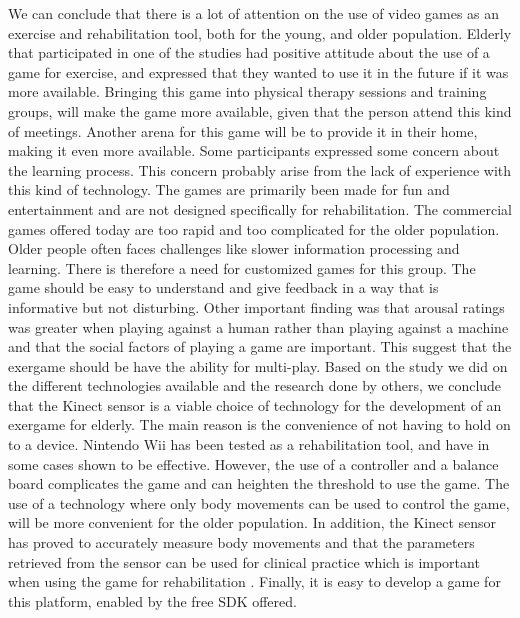 We can conclude that there is a lot of attention on the use of video games as an exercise and rehabilitation tool, both for the young, and older population. Elderly that participated in one of the studies had positive attitude about the use of a game for exercise, and expressed that they wanted to use it in the future if it was more available. Bringing this game into physical therapy sessions and training groups, will make the game more available, given that the  person attend this kind of meetings. Another arena for this game will be to provide it in their home, making it even more available.  Some participants  expressed some concern about the learning process. This concern probably arise from the lack of experience with this kind of technology.  The games are primarily been made for fun and entertainment and are not designed specifically for rehabilitation.  The commercial games offered today are too rapid and too complicated for the older population. Older people often faces challenges like slower information processing and learning. There is therefore a need for customized games for this group. The game should be easy to understand and give feedback in a way that is informative but not disturbing. Other important finding was that arousal ratings was greater when playing against a human rather than playing against a machine and that the social factors of playing a game are important. This suggest that the exergame should be have the ability for multi-play. Based on the study we did on the different technologies available and the research done by others, we conclude that the Kinect sensor is a viable choice of technology for the development of an exergame for elderly. The main reason is the convenience of not having to hold on to a device. Nintendo Wii has been tested as a rehabilitation tool, and have in some cases shown to be effective. However, the use of a controller and a balance board complicates the game and can heighten the threshold to use the game.  The use  of a technology where only body movements can be used to control the game, will be more convenient for the older population. In addition, the Kinect sensor has proved to accurately measure body movements and that the parameters retrieved from the sensor can be used for clinical practice which is important when using the game for rehabilitation .  Finally,  it is easy to develop a game for this platform, enabled by the free SDK offered.




